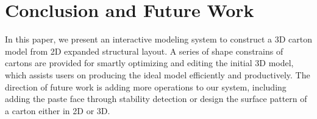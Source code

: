 \documentclass[submission]{gmp2018}
\begin{document}








\section{Conclusion and Future Work}\label{sec:conclusion}
In this paper, we present an interactive modeling system to construct a 3D carton model from 2D expanded structural layout. A series of shape constrains of cartons are provided for smartly optimizing and editing the initial 3D model, which assists users on producing the ideal model efficiently and productively. 
The direction of future work is adding more operations to our system, including adding the paste face through stability detection or design the surface pattern of a carton either in 2D or 3D. 




\end{document}
